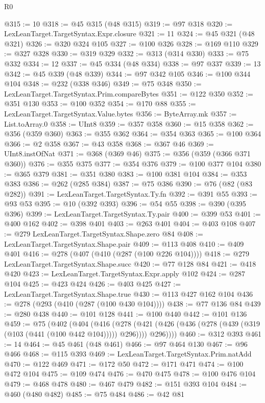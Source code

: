 \begin{lexlean}{R0}
\begin{coremodule}
@315 := 10
@318 := @45 @315 (@48 @315)
@319 := @97 @318
@320 := LexLeanTarget.TargetSyntax.Expr.closure
@321 := 11
@324 := @45 @321 (@48 @321)
@326 := @320 @324 @105
@327 := @100 @326
@328 := @169 @110
@329 := @327 @328
@330 := @319 @329
@332 := @313 (@314 @330)
@333 := @75 @332
@334 := 12
@337 := @45 @334 (@48 @334)
@338 := @97 @337
@339 := 13
@342 := @45 @339 (@48 @339)
@344 := @97 @342 @105
@346 := @100 @344 @104
@348 := @232 (@338 @346)
@349 := @75 @348
@350 := LexLeanTarget.TargetSyntax.Prim.compareBytes
@351 := @122 @350
@352 := @351 @130
@353 := @100 @352
@354 := @170 @88
@355 := LexLeanTarget.TargetSyntax.Value.bytes
@356 := ByteArray.mk
@357 := List.toArray.{0}
@358 := UInt8
@359 := @357 @358
@360 := @15 @358
@362 := @356 (@359 @360)
@363 := @355 @362
@364 := @354 @363
@365 := @100 @364
@366 := @2 @358
@367 := @43 @358
@368 := @367 @46
@369 := UInt8.instOfNat
@371 := @368 (@369 @46)
@375 := @356 (@359 (@366 @371 @360))
@376 := @355 @375
@377 := @354 @376
@379 := @100 @377 @104
@380 := @365 @379
@381 := @351 @380
@383 := @100 @381 @104
@384 := @353 @383
@386 := @262 (@285 @384)
@387 := @75 @386
@390 := @76 (@82 (@83 @282))
@391 := LexLeanTarget.TargetSyntax.Ty.fn
@392 := @391 @55
@393 := @93 @53
@395 := @10 (@392 @393)
@396 := @54 @55
@398 := @390 (@395 @396)
@399 := LexLeanTarget.TargetSyntax.Ty.pair
@400 := @399 @53
@401 := @400 @162
@402 := @398 @401
@403 := @263 @401
@404 := @403 @108
@407 := @279 LexLeanTarget.TargetSyntax.Shape.zero @84
@408 := LexLeanTarget.TargetSyntax.Shape.pair
@409 := @113 @408
@410 := @409 @401
@416 := @278 (@407 (@410 (@287 (@100 @226 @104))))
@418 := @279 LexLeanTarget.TargetSyntax.Shape.succ
@420 := @77 @128 @84
@421 := @418 @420
@423 := LexLeanTarget.TargetSyntax.Expr.apply @102
@424 := @287 @104
@425 := @423 @424
@426 := @403 @425
@427 := LexLeanTarget.TargetSyntax.Shape.true
@430 := @113 @427 @162 @104
@436 := @278 (@293 (@410 (@287 (@100 @430 @104))))
@438 := @77 @136 @84
@439 := @280 @438
@440 := @101 @128
@441 := @100 @440
@442 := @101 @136
@459 := @75
    (@402
      (@404
        (@416
          (@278
            (@421 (@426 (@436 (@278 (@439 (@319 (@103 (@441 (@100 @442 @104))))) @296))))
            @296))))
@460 := @312 @393
@461 := 14
@464 := @45 @461 (@48 @461)
@466 := @97 @464 @130
@467 := @96 @466
@468 := @115 @393
@469 := LexLeanTarget.TargetSyntax.Prim.natAdd
@470 := @122 @469
@471 := @172 @50
@472 := @171 @471
@474 := @100 @472 @104
@475 := @109 @474
@476 := @470 @475
@478 := @100 @476 @104
@479 := @468 @478
@480 := @467 @479
@482 := @151 @393 @104
@484 := @460 (@480 @482)
@485 := @75 @484
@486 := @42 @81

\end{coremodule}
\end{lexlean}

